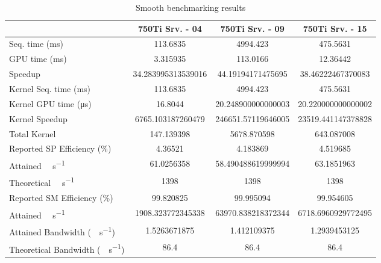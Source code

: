 \begin{table}[H]
	\centering
	\caption{Smooth benchmarking results}
	\label{tab:smooth-results}
	\begin{tabular}{lS[table-format=7.1]S[table-format=7.1]S[table-format=7.1]}
		\toprule
			~ & {\textbf{750Ti Srv. - 04}} & {\textbf{750Ti Srv. - 09}} & {\textbf{750Ti Srv. - 15}} \\
		\midrule
			{Seq. time (\si{\milli\second})} & 113.6835 & 4994.423 & 475.5631 \\
			{GPU time (\si{\milli\second})} & 3.315935 & 113.0166 & 12.36442 \\
			{Speedup} & 34.283995313539016 &44.19194171475695 & 38.46222467370083 \\
		\midrule
			{Kernel Seq. time (\si{\milli\second})} & 113.6835 & 4994.423 & 475.5631 \\
			{Kernel GPU time (\si{\micro\second})} & 16.8044 & 20.248900000000003 & 20.220000000000002 \\
			{Kernel Speedup} & 6765.103187260479 & 246651.57119646005 & 23519.441147378828 \\
		\midrule
			{Total Kernel \si{\mega\flops}} & 147.139398 & 5678.870598 & 643.087008 \\
			{Reported SP Efficiency (\si{\percent})} & 4.36521 & 4.183869 & 4.519685 \\
			{Attained \si{\giga\flops\per\second}} & 61.0256358 & 58.490488619999994 & 63.1851963 \\
			{Theoretical \si{\giga\flops\per\second}} & 1398 & 1398 & 1398 \\
		\midrule
			{Reported SM Efficiency (\si{\percent})} & 99.820825 & 99.995094 & 99.954605 \\
			{Attained \si{\giga\iops\per\second}} & 1908.323772345338 & 63970.838218372344 & 6718.6960929772495 \\			
		\midrule
			{Attained Bandwidth (\si{\giga\byte\per\second})} & 1.5263671875 & 1.412109375  & 1.2939453125 \\
			{Theoretical Bandwidth (\si{\giga\byte\per\second})}	& 86.4 & 86.4 & 86.4 \\
		\bottomrule
	\end{tabular}
\end{table}